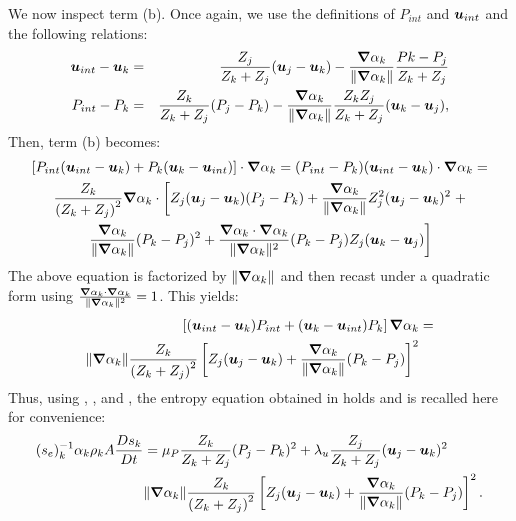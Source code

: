 \begin{appendices}
We now inspect term (b). Once again, we use the definitions of $P_{int}$ and $\boldsymbol u_{int}$ and the following relations:
\begin{eqnarray}
\label{eq:ent4bis}
\boldsymbol u_{int}-\boldsymbol u_k &=& \frac{Z_j}{Z_k+Z_j}(\boldsymbol u_j-\boldsymbol u_k) -  \frac{\boldsymbol\nabla \alpha_k}{\| \boldsymbol\nabla \alpha_k \|} \frac{Pk-P_j}{Z_k+Z_j} \nonumber\\
P_{int}-P_k &=& \frac{Z_k}{Z_k+Z_j} (P_j-P_k) - \frac{\boldsymbol\nabla \alpha_k}{\| \boldsymbol\nabla \alpha_k \|} \frac{Z_k Z_j}{Z_k+Z_j} (\boldsymbol u_k-\boldsymbol u_j), \nonumber 
\end{eqnarray}
Then, term (b) becomes:
\begin{multline}
\label{eq:ent5}
\left[ P_{int} (\boldsymbol u_{int}-\boldsymbol u_k) + P_k (\boldsymbol u_k-\boldsymbol u_{int}) \right] \cdot \boldsymbol\nabla \alpha_k = (P_{int}-P_k)(\boldsymbol u_{int}-\boldsymbol u_k)\cdot \boldsymbol\nabla \alpha_k=   \\ 
\frac{Z_k}{\left( Z_k+Z_j \right)^2} \boldsymbol\nabla \alpha_k \cdot \left[ Z_j (\boldsymbol u_j-\boldsymbol u_k)(P_j-P_k)+\frac{\boldsymbol\nabla \alpha_k}{\| \boldsymbol\nabla \alpha_k \|} Z_j^2 (\boldsymbol u_j-\boldsymbol u_k)^2 \right. + \\ 
\left. \frac{\boldsymbol\nabla \alpha_k}{\| \boldsymbol\nabla \alpha_k \|}(P_k-P_j)^2 +  \frac{\boldsymbol\nabla \alpha_k \cdot \boldsymbol\nabla \alpha_k}{\| \boldsymbol\nabla \alpha_k \|^2}(P_k-P_j)Z_j (\boldsymbol u_k-\boldsymbol u_j) \right] 
\end{multline}
The above equation is factorized by $\|  \boldsymbol\nabla \alpha_k \|$ and then recast under a quadratic form using $\frac{\boldsymbol\nabla \alpha_k \cdot \boldsymbol\nabla \alpha_k}{\| \boldsymbol\nabla \alpha_k \|^2} = 1$. This yields:
\begin{align}
\label{eq:ent6}
\left[ (\boldsymbol u_{int}-\boldsymbol u_k)P_{int} + (\boldsymbol u_k-\boldsymbol u_{int})P_k \right] \boldsymbol\nabla \alpha_k &=  \nonumber \\
\| \boldsymbol\nabla \alpha_k \| \frac{Z_k }{\left( Z_k+Z_j \right)^2} \left[ Z_j (\boldsymbol u_j-\boldsymbol u_k) + \frac{\boldsymbol\nabla \alpha_k}{\| \boldsymbol\nabla \alpha_k \|}(P_k-P_j)\right]^2
\end{align}
Thus, using , ,  and , the entropy equation obtained in \cite{SEM} holds and is recalled here for convenience:
\begin{align}
(s_{e})_k^{-1} \alpha_k \rho_k A \frac{Ds_k}{Dt} &= \mu_P \frac{Z_k}{Z_k+Z_j} (P_j - P_k)^2 + \lambda_u \frac{Z_j}{Z_k+Z_j} (\boldsymbol u_j -\boldsymbol u_k)^2 \nonumber
\\
& \| \boldsymbol\nabla \alpha_k \| \frac{Z_k}{\left( Z_k+Z_j \right)^2} \left[ Z_j (\boldsymbol u_j-\boldsymbol u_k)+\frac{\boldsymbol\nabla \alpha_k}{\| \boldsymbol\nabla \alpha_k \|}(P_k-P_j)\right]^2. \nonumber
\end{align}


\end{appendices}
